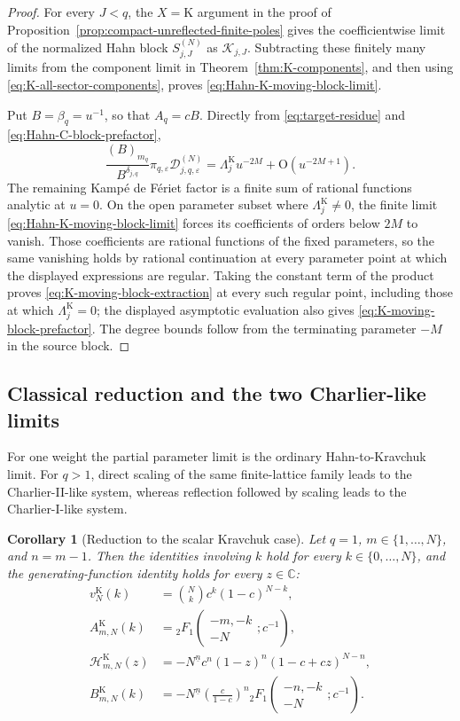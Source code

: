 \documentclass[10pt]{amsart}
\newcommand{\fall}[2]{#1^{\underline{#2}}}
\newcommand{\pFq}[5]{{}_{#1}F_{#2}\!\left(\begin{matrix}#3\\#4\end{matrix};#5\right)}
\theoremstyle{plain}
\newtheorem{corollary}[theorem]{Corollary}
\theoremstyle{definition}
\theoremstyle{remark}
\begin{document}
\begin{proof}
For every \(J<q\), the \(X=\mathrm K\) argument in the proof of
Proposition~\ref{prop:compact-unreflected-finite-poles} gives the
coefficientwise limit of the normalized Hahn block
\(S_{j,J}^{(N)}\) as \(\mathscr K_{j,J}\).  Subtracting these finitely
many limits from the component limit in
Theorem~\ref{thm:K-components}, and then using
\eqref{eq:K-all-sector-components}, proves
\eqref{eq:Hahn-K-moving-block-limit}.

Put \(B=\beta_q=u^{-1}\), so that \(A_q=cB\).  Directly from
\eqref{eq:target-residue} and \eqref{eq:Hahn-C-block-prefactor},
\[
 \frac{(B)_{m_q}}{B^{\delta_{j,q}}}
 \pi_{q,\varepsilon}\mathcal D_{j,q,\varepsilon}^{(N)}
 =\Lambda_j^{\mathrm K}u^{-2M}
  +\mathrm O(u^{-2M+1}).
\]
The remaining Kamp\'e de F\'eriet factor is a finite sum of rational
functions analytic at \(u=0\).  On the open parameter subset where
\(\Lambda_j^{\mathrm K}\ne0\), the finite limit
\eqref{eq:Hahn-K-moving-block-limit} forces its coefficients of orders
below \(2M\) to vanish. Those coefficients are rational functions of the
fixed parameters, so the same vanishing holds by rational continuation at
every parameter point at which the displayed expressions are regular.
Taking the constant term of the product proves
\eqref{eq:K-moving-block-extraction} at every such regular point, including
those at which \(\Lambda_j^{\mathrm K}=0\); the displayed asymptotic
evaluation also gives \eqref{eq:K-moving-block-prefactor}. The degree
bounds follow from
the terminating parameter \(-M\) in the source block.
\end{proof}

\subsection{Classical reduction and the two Charlier-like limits}

For one weight the partial parameter limit is the ordinary Hahn-to-Kravchuk
limit. For \(q>1\), direct scaling of the same finite-lattice family leads
to the Charlier-II-like system, whereas reflection followed by scaling leads
to the Charlier-I-like system.

\begin{corollary}[Reduction to the scalar Kravchuk case]
\label{cor:q1-Kravchuk}
Let \(q=1\), \(m\in\{1,\ldots,N\}\), and \(n=m-1\). Then
the identities involving \(k\) hold for every
\(k\in\{0,\ldots,N\}\), and the generating-function identity holds for
every \(z\in\mathbb C\):
\begin{align}
 v_N^{\mathrm K}(k)
 &=\binom Nk c^k(1-c)^{N-k},
 \label{eq:q1-K-weight}\\
 A_{m,N}^{\mathrm K}(k)
 &=\pFq{2}{1}{-m,-k}{-N}{c^{-1}},
 \label{eq:q1-K-A}\\
 \mathcal H_{m,N}^{\mathrm K}(z)
 &=-\fall{N}{n}c^n
 (1-z)^n(1-c+cz)^{N-n},
 \label{eq:q1-K-B-pgf}\\
 B_{m,N}^{\mathrm K}(k)
 &=
 -\fall{N}{n}
 \left(\frac{c}{1-c}\right)^n
 \pFq{2}{1}{-n,-k}{-N}{c^{-1}}.
 \label{eq:q1-K-B}
\end{align}
\end{corollary}
\end{document}
